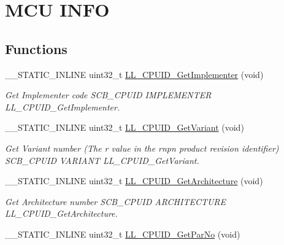 \hypertarget{group___c_o_r_t_e_x___l_l___e_f___m_c_u___i_n_f_o}{}\section{M\+CU I\+N\+FO}
\label{group___c_o_r_t_e_x___l_l___e_f___m_c_u___i_n_f_o}
\subsection*{Functions}
\begin{DoxyCompactItemize}
\item 
\+\_\+\+\_\+\+S\+T\+A\+T\+I\+C\+\_\+\+I\+N\+L\+I\+NE uint32\+\_\+t \hyperlink{group___c_o_r_t_e_x___l_l___e_f___m_c_u___i_n_f_o_ga648a5236b7fa08786086fcc4ce42b4b9}{L\+L\+\_\+\+C\+P\+U\+I\+D\+\_\+\+Get\+Implementer} (void)
\begin{DoxyCompactList}\small\item\em Get Implementer code  S\+C\+B\+\_\+\+C\+P\+U\+ID I\+M\+P\+L\+E\+M\+E\+N\+T\+ER L\+L\+\_\+\+C\+P\+U\+I\+D\+\_\+\+Get\+Implementer. \end{DoxyCompactList}\item 
\+\_\+\+\_\+\+S\+T\+A\+T\+I\+C\+\_\+\+I\+N\+L\+I\+NE uint32\+\_\+t \hyperlink{group___c_o_r_t_e_x___l_l___e_f___m_c_u___i_n_f_o_ga1f843da5f8524bace7fcf8dcce7996cb}{L\+L\+\_\+\+C\+P\+U\+I\+D\+\_\+\+Get\+Variant} (void)
\begin{DoxyCompactList}\small\item\em Get Variant number (The r value in the rnpn product revision identifier)  S\+C\+B\+\_\+\+C\+P\+U\+ID V\+A\+R\+I\+A\+NT L\+L\+\_\+\+C\+P\+U\+I\+D\+\_\+\+Get\+Variant. \end{DoxyCompactList}\item 
\+\_\+\+\_\+\+S\+T\+A\+T\+I\+C\+\_\+\+I\+N\+L\+I\+NE uint32\+\_\+t \hyperlink{group___c_o_r_t_e_x___l_l___e_f___m_c_u___i_n_f_o_gadc6dc3055d2a192ac1218e09a1e8fd19}{L\+L\+\_\+\+C\+P\+U\+I\+D\+\_\+\+Get\+Architecture} (void)
\begin{DoxyCompactList}\small\item\em Get Architecture number  S\+C\+B\+\_\+\+C\+P\+U\+ID A\+R\+C\+H\+I\+T\+E\+C\+T\+U\+RE L\+L\+\_\+\+C\+P\+U\+I\+D\+\_\+\+Get\+Architecture. \end{DoxyCompactList}\item 
\+\_\+\+\_\+\+S\+T\+A\+T\+I\+C\+\_\+\+I\+N\+L\+I\+NE uint32\+\_\+t \hyperlink{group___c_o_r_t_e_x___l_l___e_f___m_c_u___i_n_f_o_gac98fd56ad9162c3f372004bd07038bdb}{L\+L\+\_\+\+C\+P\+U\+I\+D\+\_\+\+Get\+Par\+No} (void)

\end{DoxyCompactItemize}
